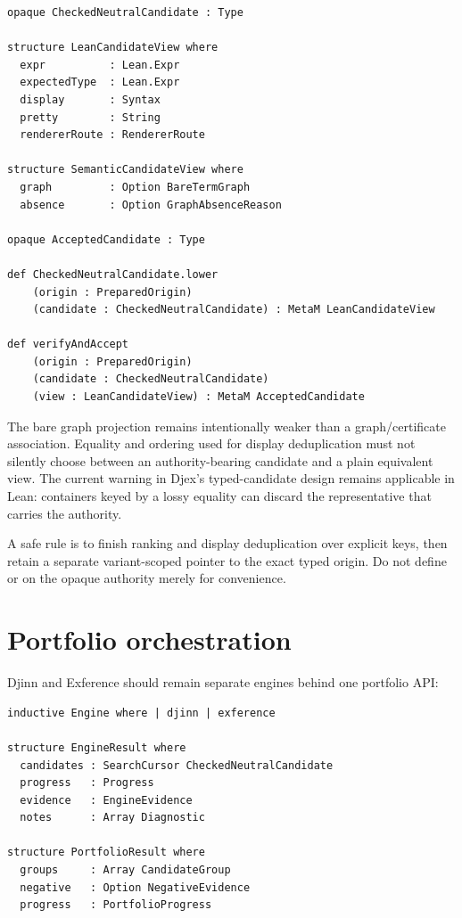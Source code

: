 \documentclass[10pt,letterpaper,oneside]{report}
\newcommand{\code}[1]{\texttt{\detokenize{#1}}}
\begin{document}
\begin{lstlisting}[language=Leanish]
opaque CheckedNeutralCandidate : Type

structure LeanCandidateView where
  expr          : Lean.Expr
  expectedType  : Lean.Expr
  display       : Syntax
  pretty        : String
  rendererRoute : RendererRoute

structure SemanticCandidateView where
  graph         : Option BareTermGraph
  absence       : Option GraphAbsenceReason

opaque AcceptedCandidate : Type

def CheckedNeutralCandidate.lower
    (origin : PreparedOrigin)
    (candidate : CheckedNeutralCandidate) : MetaM LeanCandidateView

def verifyAndAccept
    (origin : PreparedOrigin)
    (candidate : CheckedNeutralCandidate)
    (view : LeanCandidateView) : MetaM AcceptedCandidate
\end{lstlisting}

The bare graph projection remains intentionally weaker than a graph/certificate association. Equality and ordering used for display deduplication must not silently choose between an authority-bearing candidate and a plain equivalent view. The current warning in Djex's typed-candidate design remains applicable in Lean: containers keyed by a lossy equality can discard the representative that carries the authority.

A safe rule is to finish ranking and display deduplication over explicit keys, then retain a separate variant-scoped pointer to the exact typed origin. Do not define \code{BEq} or \code{Ord} on the opaque authority merely for convenience.

\section{Portfolio orchestration}

Djinn and Exference should remain separate engines behind one portfolio API:

\begin{lstlisting}[language=Leanish]
inductive Engine where | djinn | exference

structure EngineResult where
  candidates : SearchCursor CheckedNeutralCandidate
  progress   : Progress
  evidence   : EngineEvidence
  notes      : Array Diagnostic

structure PortfolioResult where
  groups     : Array CandidateGroup
  negative   : Option NegativeEvidence
  progress   : PortfolioProgress
\end{lstlisting}
\end{document}
